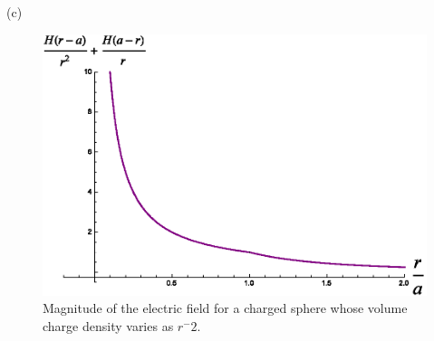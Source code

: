\begin{homeworkProblem}
\begin{homeworkSection}{(c)}
\begin{figure}%
\centerline{\includegraphics[width=.65\columnwidth,height=.25\paperheight]{./Images/nsphereequalsminustwo.eps}}%
\caption{Magnitude of the electric field for a charged sphere whose volume charge density varies as $r^-2$.}%
\label{nisminustwo}%
\end{figure}

\end{homeworkSection}

\end{homeworkProblem}

